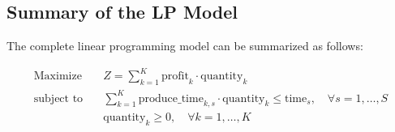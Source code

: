 \documentclass{article}
\begin{document}
\subsection*{Summary of the LP Model}
The complete linear programming model can be summarized as follows:

\begin{align*}
    \text{Maximize} \quad & Z = \sum_{k=1}^{K} \text{profit}_{k} \cdot \text{quantity}_{k} \\
    \text{subject to} \quad & \sum_{k=1}^{K} \text{produce\_time}_{k,s} \cdot \text{quantity}_{k} \leq \text{time}_{s}, \quad \forall s = 1, \ldots, S \\
    & \text{quantity}_{k} \geq 0, \quad \forall k = 1, \ldots, K
\end{align*}
\end{document}
